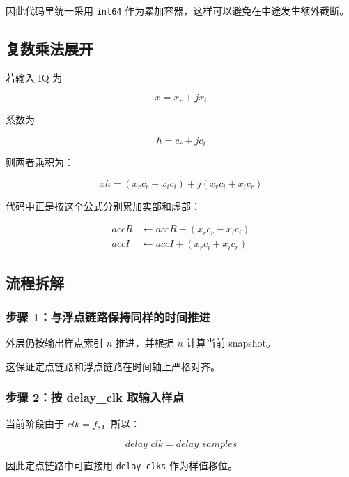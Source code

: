 \documentclass[12pt,a4paper]{article}
\begin{document}
因此代码里统一采用 \texttt{int64} 作为累加容器，这样可以避免在中途发生额外截断。

\subsection{复数乘法展开}

若输入 IQ 为

\begin{equation}
x = x_r + jx_i
\end{equation}

系数为

\begin{equation}
h = c_r + jc_i
\end{equation}

则两者乘积为：

\begin{equation}
xh = (x_r c_r - x_i c_i) + j(x_r c_i + x_i c_r)
\end{equation}

代码中正是按这个公式分别累加实部和虚部：

\begin{align}
accR &\leftarrow accR + (x_r c_r - x_i c_i) \\
accI &\leftarrow accI + (x_r c_i + x_i c_r)
\end{align}

\subsection{流程拆解}

\subsubsection{步骤 1：与浮点链路保持同样的时间推进}

外层仍按输出样点索引 $n$ 推进，并根据 $n$ 计算当前 snapshot。

这保证定点链路和浮点链路在时间轴上严格对齐。

\subsubsection{步骤 2：按 delay\_clk 取输入样点}

当前阶段由于 $clk = f_s$，所以：

\begin{equation}
delay\_clk = delay\_samples
\end{equation}

因此定点链路中可直接用 \texttt{delay\_clks} 作为样值移位。
\end{document}
